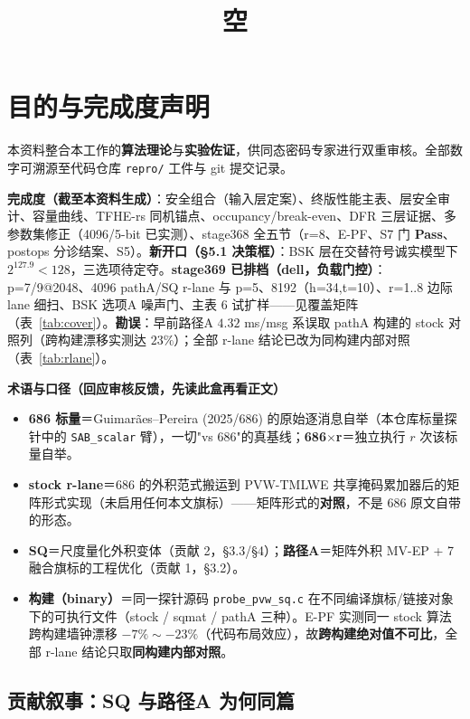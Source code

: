 \documentclass[11pt]{article}
\title{空}
\date{}
\begin{document}
\tableofcontents
\newpage

\section{目的与完成度声明}

本资料整合本工作的\textbf{算法理论}与\textbf{实验佐证}，供同态密码专家进行双重审核。全部数字可溯源至代码仓库 \texttt{repro/} 工件与 git 提交记录。

\begin{keybox}
\textbf{完成度（截至本资料生成）}：安全组合（输入层定案）、终版性能主表、层安全审计、容量曲线、TFHE-rs 同机锚点、occupancy/break-even、DFR 三层证据、多参数集修正（4096/5-bit 已实测）、stage368 全五节（r=8、E-PF、S7 门 \textbf{Pass}、postops 分诊结案、S5）。\textbf{新开口（\S5.1 决策框）}：BSK 层在交替符号诚实模型下 $2^{127.9}<128$，三选项待定夺。\textbf{stage369 已排档（dell，负载门控）}：p=7/9@2048、4096 pathA/SQ r-lane 与 p=5、8192（h=34,t=10）、r=1..8 边际 lane 细扫、BSK 选项A 噪声门、主表 6 试扩样——见覆盖矩阵（表~\ref{tab:cover}）。\textbf{勘误}：早前路径A $4.32$ ms/msg 系误取 pathA 构建的 stock 对照列（跨构建漂移实测达 $23\%$）；全部 r-lane 结论已改为同构建内部对照（表~\ref{tab:rlane}）。

\begin{keybox}
\textbf{术语与口径（回应审核反馈，先读此盒再看正文）}
\begin{itemize}
\item \textbf{686 标量}＝Guimar\~aes--Pereira (2025/686) 的原始逐消息自举（本仓库标量探针中的 \texttt{SAB\_scalar} 臂），一切"vs 686"的真基线；\textbf{686$\times$r}＝独立执行 $r$ 次该标量自举。
\item \textbf{stock r-lane}＝686 的外积范式搬运到 PVW-TMLWE 共享掩码累加器后的矩阵形式实现（未启用任何本文旗标）——矩阵形式的\textbf{对照}，不是 686 原文自带的形态。
\item \textbf{SQ}＝尺度量化外积变体（贡献 2，\S3.3/\S4）；\textbf{路径A}＝矩阵外积 MV-EP + 7 融合旗标的工程优化（贡献 1，\S3.2）。
\item \textbf{构建（binary）}＝同一探针源码 \texttt{probe\_pvw\_sq.c} 在不同编译旗标/链接对象下的可执行文件（stock / sqmat / pathA 三种）。E-PF 实测同一 stock 算法跨构建墙钟漂移 $-7\%\sim-23\%$（代码布局效应），故\textbf{跨构建绝对值不可比}，全部 r-lane 结论只取\textbf{同构建内部对照}。
\end{itemize}
\end{keybox}

\subsection{贡献叙事：SQ 与路径A 为何同篇}


\end{keybox}
\end{document}
